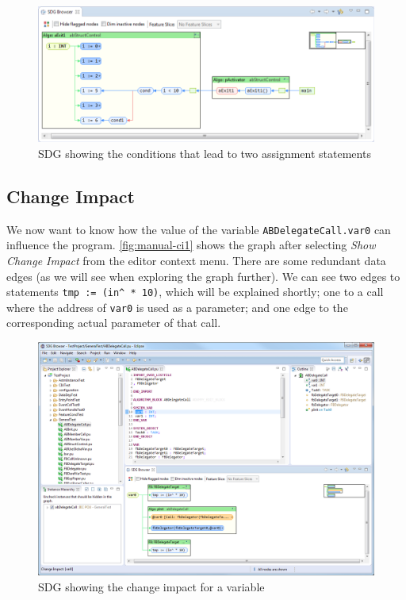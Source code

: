 \begin{figure}[htp]
  \centering
    \includegraphics[width=\textwidth]{bilder/manual-assign2}
  \caption{SDG showing the conditions that lead to two assignment statements}
  \label{fig:manual-assign2}
\end{figure}

\subsection*{Change Impact}

We now want to know how the value of the variable \lstinline|ABDelegateCall.var0| can influence the program. 
\autoref{fig:manual-ci1} shows the graph after selecting \emph{Show Change Impact} from the editor context menu. There 
are some redundant data edges (as we will see when exploring the graph further). We can see two edges to statements 
\lstinline|tmp := (in^ * 10)|, which will be explained shortly; one to a call where the address of \lstinline|var0| is 
used as a parameter; and one edge to the corresponding actual parameter of that call.

\begin{figure}[hpb]
  \centering
    \includegraphics[width=\textwidth]{bilder/manual-ci1}
  \caption{SDG showing the change impact for a variable}
  \label{fig:manual-ci1}
\end{figure}

